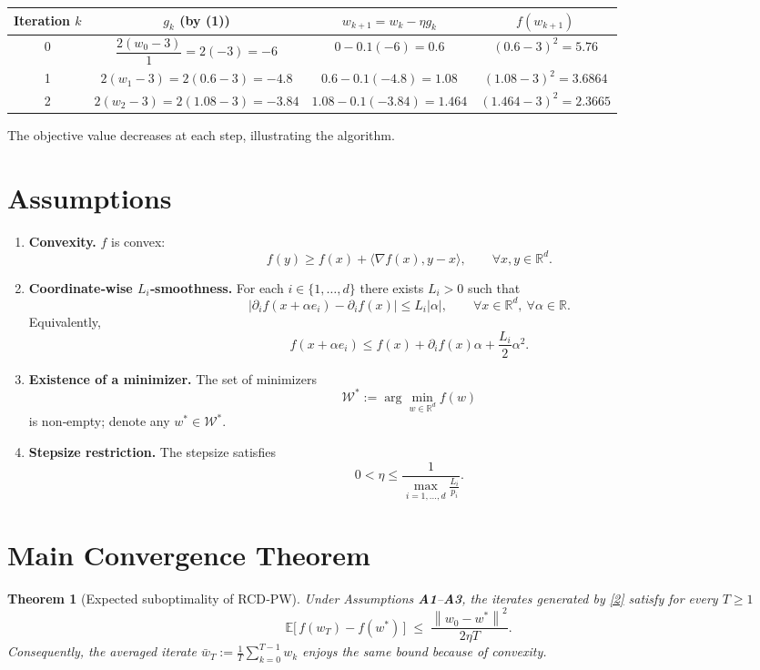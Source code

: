 \documentclass[11pt]{article}
\newtheorem{theorem}{Theorem}
\newcommand{\EE}{\mathbb{E}}
\newcommand{\RR}{\mathbb{R}}
\newcommand{\norm}[1]{\left\lVert#1\right\rVert}
\begin{document}
\begin{center}
\begin{tabular}{c|c|c|c}
Iteration $k$ & $g_k$ (by (1)) & $w_{k+1}=w_k-\eta g_k$ & $f(w_{k+1})$\\\hline
0 & $\dfrac{2(w_0-3)}{1}=2(-3)=-6$ & $0-0.1(-6)=0.6$ & $(0.6-3)^2=5.76$\\
1 & $2(w_1-3)=2(0.6-3)=-4.8$ & $0.6-0.1(-4.8)=1.08$ & $(1.08-3)^2=3.6864$\\
2 & $2(w_2-3)=2(1.08-3)=-3.84$ & $1.08-0.1(-3.84)=1.464$ & $(1.464-3)^2=2.3665$\\
\end{tabular}
\end{center}
The objective value decreases at each step, illustrating the algorithm.

\newpage

\section*{Assumptions}
\begin{enumerate}[label=\textbf{A\arabic*}, leftmargin=*]
\item \textbf{Convexity.} $f$ is convex:
\[
f(y)\ge f(x)+\langle\nabla f(x),y-x\rangle,\qquad\forall x,y\in\RR^{d}.
\tag{A1}
\]

\item \textbf{Coordinate‑wise $L_i$‑smoothness.} For each $i\in\{1,\dots ,d\}$ there exists $L_i>0$ such that
\[
\big|\partial_i f(x+\alpha e_i)-\partial_i f(x)\big|\le L_i|\alpha|,
\qquad\forall x\in\RR^{d},\ \forall\alpha\in\RR .
\tag{A2}
\]
Equivalently,
\[
f(x+\alpha e_i)\le f(x)+\partial_i f(x)\alpha+\frac{L_i}{2}\alpha^{2}.
\tag{A2'}
\]

\item \textbf{Existence of a minimizer.} The set of minimizers
\[
\mathcal W^{*}:=\arg\min_{w\in\RR^{d}}f(w)
\]
is non‑empty; denote any $w^{*}\in\mathcal W^{*}$.

\item \textbf{Stepsize restriction.} The stepsize satisfies
\[
0<\eta\le\frac{1}{\displaystyle\max_{i=1,\dots ,d}\frac{L_i}{p_i}} .
\tag{A3}
\]
\end{enumerate}

\section*{Main Convergence Theorem}
\begin{theorem}[Expected suboptimality of RCD‑PW]\label{thm:main}
Under Assumptions \textbf{A1}–\textbf{A3}, the iterates generated by
\eqref{2} satisfy for every $T\ge1$
\[
\EE\!\big[\,f(w_T)-f(w^{*})\,\big]\;\le\;
\frac{\norm{w_0-w^{*}}^{2}}{2\eta T}.
\tag{4}
\]
Consequently, the averaged iterate $\bar w_T:=\frac1T\sum_{k=0}^{T-1}w_k$ enjoys the same bound because of convexity.
\end{theorem}
\end{document}
